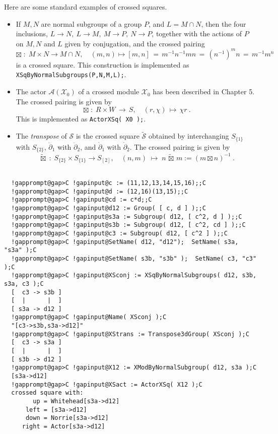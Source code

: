 \documentclass[a4paper,11pt]{report}
\begin{document}
{{{ Here are some standard examples of crossed squares. 
\begin{itemize}
\item  If $M, N$ are normal subgroups of a group $P$, and $L = M \cap N$, then the four inclusions, $L \to N,~ L \to M,~ M \to P,~ N \to P$, together with the actions of $P$ on $M, N$ and $L$ given by conjugation, and the crossed pairing 
\[ \boxtimes \;:\; M \times N \to M\cap N, \quad (m,n) \mapsto [m,n] \,=\,
m^{-1}n^{-1}mn \,=\,(n^{-1})^mn \,=\, m^{-1}m^n \]
 is a crossed square. This construction is implemented as \texttt{XSqByNormalSubgroups(P,N,M,L);}. 
\item  The actor $\mathcal{A}(\mathcal{X}_0)$ of a crossed module $\mathcal{X}_0$ has been described in Chapter 5. The crossed pairing is given by 
\[ \boxtimes \;:\; R \times W \,\to\, S, \quad (r,\chi) \,\mapsto\, \chi r~. \]
 This is implemented as \texttt{ActorXSq( X0 );}. 
\item  The \emph{transpose} of $\mathcal{S}$ is the crossed square $\tilde{\mathcal{S}}$ obtained by interchanging $S_{\{1\}}$ with $S_{\{2\}}$, $\ddot{\partial}_1$ with $\ddot{\partial}_2$, and $\dot{\partial}_1$ with $\dot{\partial}_2$. The crossed pairing is given by 
\[ \tilde{\boxtimes} \;:\; S_{\{2\}} \times S_{\{1\}} \to S_{[2]}, \quad (n,m)
\;\mapsto\; n\,\tilde{\boxtimes}\,m := (m \boxtimes n)^{-1}~. \]
 
\end{itemize}
 }

 
\begin{Verbatim}[commandchars=!@C,fontsize=\small,frame=single,label=Example]
  
  !gapprompt@gap>C !gapinput@c := (11,12,13,14,15,16);;C
  !gapprompt@gap>C !gapinput@d := (12,16)(13,15);;C
  !gapprompt@gap>C !gapinput@cd := c*d;;C
  !gapprompt@gap>C !gapinput@d12 := Group( [ c, d ] );;C
  !gapprompt@gap>C !gapinput@s3a := Subgroup( d12, [ c^2, d ] );;C
  !gapprompt@gap>C !gapinput@s3b := Subgroup( d12, [ c^2, cd ] );;C
  !gapprompt@gap>C !gapinput@c3 := Subgroup( d12, [ c^2 ] );;C
  !gapprompt@gap>C !gapinput@SetName( d12, "d12");  SetName( s3a, "s3a" );C
  !gapprompt@gap>C !gapinput@SetName( s3b, "s3b" );  SetName( c3, "c3" );C
  !gapprompt@gap>C !gapinput@XSconj := XSqByNormalSubgroups( d12, s3b, s3a, c3 );C
  [  c3 -> s3b ]
  [  |      |  ]
  [ s3a -> d12 ]
  !gapprompt@gap>C !gapinput@Name( XSconj );C
  "[c3->s3b,s3a->d12]"
  !gapprompt@gap>C !gapinput@XStrans := Transpose3dGroup( XSconj );C
  [  c3 -> s3a ]
  [  |      |  ]
  [ s3b -> d12 ]
  !gapprompt@gap>C !gapinput@X12 := XModByNormalSubgroup( d12, s3a );C
  [s3a->d12]
  !gapprompt@gap>C !gapinput@XSact := ActorXSq( X12 );C
  crossed square with:
        up = Whitehead[s3a->d12]
      left = [s3a->d12]
      down = Norrie[s3a->d12]
     right = Actor[s3a->d12]
  

\end{Verbatim}}}
\end{document}
